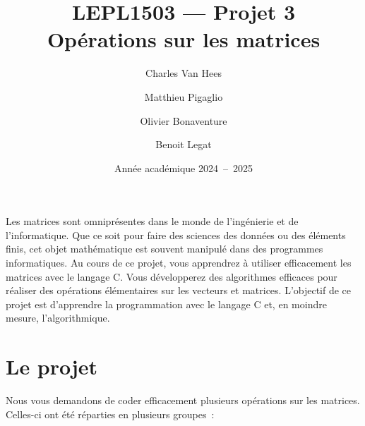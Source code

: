 \documentclass[a4paper, 12pt]{article}
\title{LEPL1503 --- Projet 3 \\ Opérations sur les matrices}
\author{Charles Van Hees \and Matthieu Pigaglio \and Olivier Bonaventure \and Benoit Legat}
\date{Année académique 2024~--~2025}
\begin{document}
\maketitle

Les matrices sont omniprésentes dans le monde de l'ingénierie et de l'informatique. Que ce soit pour faire des sciences des données ou des éléments finis, cet objet mathématique est souvent manipulé dans des programmes informatiques. Au cours de ce projet, vous apprendrez à utiliser efficacement les matrices avec le langage C. Vous développerez des algorithmes efficaces pour réaliser des opérations élémentaires sur les vecteurs et matrices. L'objectif de ce projet est d'apprendre la programmation avec le langage C et, en moindre mesure, l'algorithmique.

\section{Le projet}
\noindent Nous vous demandons de coder efficacement plusieurs opérations sur les matrices. Celles-ci ont été réparties en plusieurs groupes~:
\end{document}
